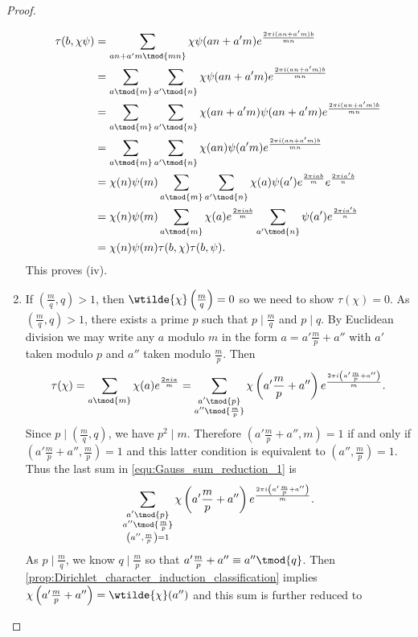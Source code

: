 \begin{proof}
\begin{enumerate}[label=(\roman*)]
          \begin{align*}
            \tau(b,\chi\psi) &= \sum_{an+a'm \tmod{mn}}\chi\psi(an+a'm)e^{\frac{2\pi i(an+a'm)b}{mn}} \\
            &= \sum_{a\tmod{m}}\sum_{a'\tmod{n}}\chi\psi(an+a'm)e^{\frac{2\pi i(an+a'm)b}{mn}} \\
            &= \sum_{a\tmod{m}}\sum_{a'\tmod{n}}\chi(an+a'm)\psi(an+a'm)e^{\frac{2\pi i(an+a'm)b}{mn}} \\
            &= \sum_{a\tmod{m}}\sum_{a'\tmod{n}}\chi(an)\psi(a'm)e^{\frac{2\pi i(an+a'm)b}{mn}} \\
            &= \chi(n)\psi(m)\sum_{a\tmod{m}}\sum_{a'\tmod{n}}\chi(a)\psi(a')e^{\frac{2\pi iab}{m}}e^{\frac{2\pi ia'b}{n}} \\
            &= \chi(n)\psi(m)\sum_{a\tmod{m}}\chi(a)e^{\frac{2\pi iab}{m}}\sum_{a'\tmod{n}}\psi(a')e^{\frac{2\pi ia'b}{n}} \\
            &= \chi(n)\psi(m)\tau(b,\chi)\tau(b,\psi).
          \end{align*}
          This proves (iv).
          \item If $\left(\frac{m}{q},q\right) > 1$, then $\wtilde{\chi}\left(\frac{m}{q}\right) = 0$ so we need to show $\tau(\chi) = 0$. As $\left(\frac{m}{q},q\right) > 1$, there exists a prime $p$ such that $p \mid \frac{m}{q}$ and $p \mid q$. By Euclidean division we may write any $a$ modulo $m$ in the form $a = a'\frac{m}{p}+a''$ with $a'$ taken modulo $p$ and $a''$ taken modulo $\frac{m}{p}$. Then
          \begin{equation}\label{equ:Gauss_sum_reduction_1}
            \tau(\chi) = \sum_{a \tmod{m}}\chi(a)e^{\frac{2\pi ia}{m}} = \sum_{\substack{a' \tmod{p} \\ a'' \tmod{\frac{m}{p}}}}\chi\left(a'\frac{m}{p}+a''\right)e^{\frac{2\pi i\left(a'\frac{m}{p}+a''\right)}{m}}.
          \end{equation}
          Since $p \mid \left(\frac{m}{q},q\right)$, we have $p^{2} \mid m$. Therefore $\left(a'\frac{m}{p}+a'',m\right) = 1$ if and only if $\left(a'\frac{m}{p}+a'',\frac{m}{p}\right) = 1$ and this latter condition is equivalent to $\left(a'',\frac{m}{p}\right) = 1$. Thus the last sum in \cref{equ:Gauss_sum_reduction_1} is
          \[
            \sum_{\substack{a' \tmod{p} \\ a'' \tmod{\frac{m}{p}} \\ \left(a'',\frac{m}{p}\right) = 1}}\chi\left(a'\frac{m}{p}+a''\right)e^{\frac{2\pi i\left(a'\frac{m}{p}+a''\right)}{m}}.
          \]
          As $p \mid \frac{m}{q}$, we know $q \mid \frac{m}{p}$ so that $a'\frac{m}{p}+a'' \equiv a'' \tmod{q}$. Then \cref{prop:Dirichlet_character_induction_classification} implies $\chi\left(a'\frac{m}{p}+a''\right) = \wtilde{\chi}(a'')$ and this sum is further reduced to

\end{enumerate}
\end{proof}
